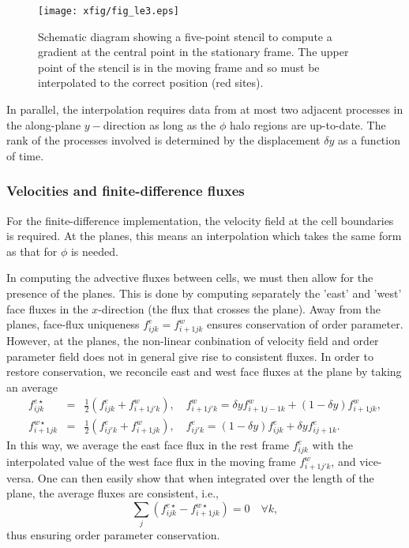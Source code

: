 \begin{figure}[h]
\begin{center}
\texttt{[image: xfig/fig\_le3.eps]}
\end{center}
\caption{Schematic diagram showing a five-point stencil to compute a
gradient at the central point in the stationary frame. The upper point
of the stencil is in the moving frame and so must be interpolated to
the correct position (red sites).}
\label{fig_le3}
\end{figure}

In parallel, the interpolation requires data from at most two adjacent
processes in the along-plane $y-$direction as long as the $\phi$ halo
regions are up-to-date. The rank of the processes involved is
determined by the displacement $\delta y$ as a function of time.


\subsubsection{Velocities and finite-difference fluxes}

For the finite-difference implementation, the velocity field at
the cell boundaries is required. At the planes, this means an
interpolation which takes the same form as that for
$\phi$ is needed.

In computing the advective fluxes between cells, we must then
allow for the presence of the planes. This is done by computing
separately the 'east' and 'west' face fluxes in the $x$-direction
(the flux that crosses the plane). Away from the planes, face-flux
uniqueness $f_{ijk}^e = f_{i+1jk}^w$ ensures conservation of order
parameter. However, at the planes, the non-linear conbination of
velocity field and order parameter field does not in general give
rise to consistent fluxes. In order to restore conservation, we
reconcile east and west face fluxes at the plane by taking an
average
\begin{eqnarray}
f_{ijk}^{e\star}&=&{\textstyle\frac{1}{2}}(f_{ijk}^e + f_{i+1j'k}^w),\quad 
f_{i+1j'k}^w  = \delta y f_{i+1 j-1 k}^w + (1 - \delta y) f_{i+1jk}^w,\\
f_{i+1 j k}^{w\star} &=& {\textstyle\frac{1}{2}}(f_{ij'k}^e + f_{i+1jk}^w),\quad
f_{ij'k}^e = (1 - \delta y) f_{ijk}^e + \delta y f_{ij+1k}^e.
\end{eqnarray}
In this way, we average the east face flux in the rest frame $f_{ijk}^e$
with the interpolated value of the west face flux in the moving frame
$f_{i+1j'k}^w$, and vice-versa. One can then easily show that when
integrated over the length of the plane, the average fluxes are
consistent, i.e.,
\begin{equation}
\sum_j (f_{ijk}^{e\star} - f_{i+1jk}^{w\star}) = 0 \quad\forall k,
\end{equation}
thus ensuring order parameter conservation.

